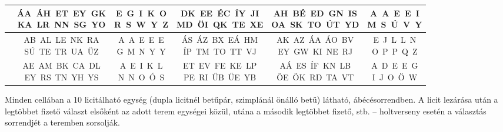 \documentclass[11pt]{extarticle}
\begin{document}
\begin{center}
\begin{tabular}{|lccccc|}
\textbf{\rule{0pt}{3.4ex}108. terem\rule[-1.4ex]{0pt}{0pt}} & \shortstack{\rule{0pt}{3.4ex}ÁA~ÁH~ET~EY~GK \\ KA~LR~NN~SG~YO\rule[-1.4ex]{0pt}{0pt}} & \shortstack{\rule{0pt}{3.4ex}E~G~I~K~O \\ R~S~W~Y~Z\rule[-1.4ex]{0pt}{0pt}} & \shortstack{\rule{0pt}{3.4ex}DK~EE~ÉC~ÍY~JI \\ MD~ÖI~QK~TE~XE\rule[-1.4ex]{0pt}{0pt}} & \shortstack{\rule{0pt}{3.4ex}AH~BÉ~ED~GN~IS \\ OA~SK~TO~ÚT~YD\rule[-1.4ex]{0pt}{0pt}} & \shortstack{\rule{0pt}{3.4ex}A~A~E~E~I \\ M~S~Ú~V~Y\rule[-1.4ex]{0pt}{0pt}} \\ \hline
\textbf{\rule{0pt}{3.4ex}110. terem\rule[-1.4ex]{0pt}{0pt}} & \shortstack{\rule{0pt}{3.4ex}AB~AL~LE~NK~RA \\ SÚ~TE~TR~UA~ÜZ\rule[-1.4ex]{0pt}{0pt}} & \shortstack{\rule{0pt}{3.4ex}A~A~E~E~E \\ G~M~N~Y~Y\rule[-1.4ex]{0pt}{0pt}} & \shortstack{\rule{0pt}{3.4ex}ÁS~ÁZ~BX~EÁ~HM \\ ÍP~TM~TO~TT~VJ\rule[-1.4ex]{0pt}{0pt}} & \shortstack{\rule{0pt}{3.4ex}AK~AZ~ÁA~ÁO~BV \\ EY~GW~KI~NE~RJ\rule[-1.4ex]{0pt}{0pt}} & \shortstack{\rule{0pt}{3.4ex}E~J~L~L~N \\ O~P~P~Q~Z\rule[-1.4ex]{0pt}{0pt}} \\ \hline
\textbf{\rule{0pt}{3.4ex}112. terem\rule[-1.4ex]{0pt}{0pt}} & \shortstack{\rule{0pt}{3.4ex}AE~AM~BK~CA~DL \\ EY~RS~TN~YH~YS\rule[-1.4ex]{0pt}{0pt}} & \shortstack{\rule{0pt}{3.4ex}A~E~I~K~L \\ N~N~O~Ó~S\rule[-1.4ex]{0pt}{0pt}} & \shortstack{\rule{0pt}{3.4ex}ET~EV~FE~KE~LP \\ PE~RI~ŰB~ŰE~YB\rule[-1.4ex]{0pt}{0pt}} & \shortstack{\rule{0pt}{3.4ex}AÁ~ES~ÍF~KN~LB \\ ÖE~ÖK~RD~TA~VT\rule[-1.4ex]{0pt}{0pt}} & \shortstack{\rule{0pt}{3.4ex}A~D~E~E~G \\ I~J~O~Ö~W\rule[-1.4ex]{0pt}{0pt}} \\ \hline
\end{tabular}
\end{center}

\vspace{6pt}
{\footnotesize Minden cellában a 10 licitálható egység (dupla licitnél betűpár, szimplánál
önálló betű) látható, ábécésorrendben. A licit lezárása után a legtöbbet fizető választ
elsőként az adott terem egységei közül, utána a második legtöbbet fizető, stb. -- holtverseny
esetén a választás sorrendjét a teremben sorsolják.}
\end{document}
